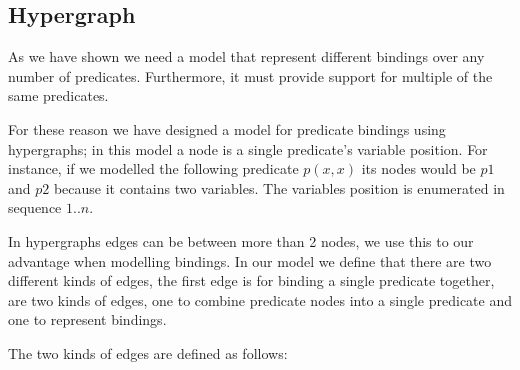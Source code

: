 \documentclass[../Master.tex]{subfiles}
\begin{document}
	
	\subsection*{Hypergraph}
	As we have shown we need a model that represent different bindings over any number of predicates. 
	Furthermore, it must provide support for multiple of the same predicates.
	
	For these reason we have designed a model for predicate bindings using hypergraphs; 
	in this	model a node is a single predicate's variable position. 
	For instance, if we modelled the following predicate $p(x,x)$ its nodes would be $p1$ and $p2$ because it contains two variables.
	The variables position is enumerated in sequence $1..n$.	 
	
	In hypergraphs edges can be between more than 2 nodes, we use this to our advantage when modelling bindings. 
	In our model we define that there are two different kinds of edges, the first edge is for binding a single predicate together, 
	are two kinds of edges, one to combine predicate nodes into a single predicate and one to represent bindings.
	
	The two kinds of edges are defined as follows: 
	
\end{document}

